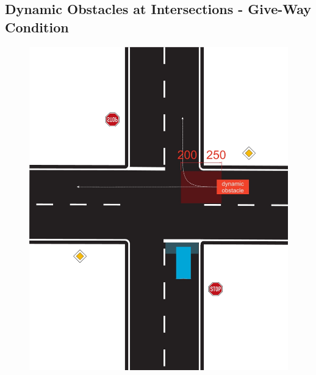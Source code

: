 \subsection{Dynamic Obstacles at Intersections - Give-Way Condition}
\label{fig_intersection_give_way}
\begin{figure}[H]
	\begin{center}
		\centering\includegraphics[]{graphics/Abb_6_intersection_give_way.jpg}
	\end{center}
\end{figure}

